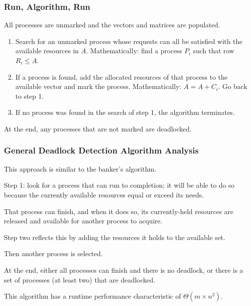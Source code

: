 \begin{frame}
	\frametitle{Run, Algorithm, Run}

	All processes are unmarked and the vectors and matrices are populated.

	\begin{enumerate}
		\item Search for an unmarked process whose requests can all be satisfied with the available resources in $A$. Mathematically: find a process $P_{i}$ such that row $R_{i} \leq A$.
		\item If a process is found, add the allocated resources of that process to the available vector and mark the process. Mathematically: $A = A + C_{i}$. Go back to step 1.
		\item If no process was found in the search of step 1, the algorithm terminates.
	\end{enumerate}

	At the end, any processes that are not marked are deadlocked.

\end{frame}

\begin{frame}
	\frametitle{General Deadlock Detection Algorithm Analysis}

	This approach is similar to the banker's algorithm.

	Step 1: look for a process that can run to completion; it will be able to do so because the currently available resources equal or exceed its needs.

	That process can finish, and when it does so, its currently-held resources are released and available for another process to acquire.

	Step two reflects this by adding the resources it holds to the available set.

	Then another process is selected.

	At the end, either all processes can finish and there is no deadlock, or there is a set of processes (at least two) that are deadlocked.

	This algorithm has a runtime performance characteristic of $\Theta(m \times n^{2})$.


\end{frame}

